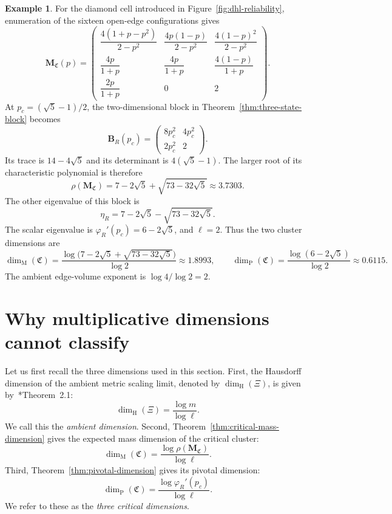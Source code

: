\documentclass[scheme=plain,11pt]{ctexart}
\theoremstyle{definition}
\newtheorem{example}[theorem]{Example}
\theoremstyle{remark}
\newcommand{\dimhaus}{\dim_{\mathrm H}}
\newcommand{\dimmass}{\dim_{\mathrm M}}
\begin{document}
\begin{example}\label{ex:dhl-response}\label{ex:dhl-dimensions}
For the diamond cell introduced in Figure~\ref{fig:dhl-reliability}, enumeration of the sixteen open-edge configurations gives
\[
\mathbf M_{\mathfrak C}(p)=
\begin{pmatrix}
\dfrac{4(1+p-p^2)}{2-p^2}&\dfrac{4p(1-p)}{2-p^2}&\dfrac{4(1-p)^2}{2-p^2}\\[2ex]
\dfrac{4p}{1+p}&\dfrac{4p}{1+p}&\dfrac{4(1-p)}{1+p}\\[2ex]
\dfrac{2p}{1+p}&0&2
\end{pmatrix}.
\]
At $p_c=(\sqrt5-1)/2$, the two-dimensional block in Theorem~\ref{thm:three-state-block} becomes
\[
\mathbf B_R(p_c)=
\begin{pmatrix}
8p_c^2&4p_c^2\\
2p_c^2&2
\end{pmatrix}.
\]
Its trace is $14-4\sqrt5$ and its determinant is $4(\sqrt5-1)$.
The larger root of its characteristic polynomial is therefore
\[
\rho(\mathbf M_{\mathfrak C})=7-2\sqrt5+\sqrt{73-32\sqrt5}
\approx3.7303.
\]
The other eigenvalue of this block is
\[
 \eta_R=7-2\sqrt5-\sqrt{73-32\sqrt5}.
\]
The scalar eigenvalue is $\varphi_R'(p_c)=6-2\sqrt5$, and $\ell=2$.
Thus the two cluster dimensions are
\[
 \dimmass(\mathfrak C)
 =\frac{\log\bigl(7-2\sqrt5+\sqrt{73-32\sqrt5}\bigr)}{\log2}
 \approx1.8993,\qquad
 \dim_{\mathrm P}(\mathfrak C)
 =\frac{\log(6-2\sqrt5)}{\log2}\approx0.6115.
\]
The ambient edge-volume exponent is $\log4/\log2=2$.
\end{example}





\section{Why multiplicative dimensions cannot classify}\label{sec:universality}\label{sec:converse-rigidity}\label{sec:three-dimensions}



Let us first recall the three dimensions used in this section.
First, the Hausdorff dimension of the ambient metric scaling limit, denoted by $\dimhaus(\Xi)$, is given by~\cite{neroli2024fractal}*{Theorem~2.1}:
\[
 \dimhaus(\Xi)=\frac{\log m}{\log\ell}.
\]
We call this the \emph{ambient dimension}.
Second, Theorem~\ref{thm:critical-mass-dimension} gives the expected mass dimension of the critical cluster:
\[
 \dimmass(\mathfrak C)=\frac{\log\rho(\mathbf M_{\mathfrak C})}{\log\ell}.
\]
Third, Theorem~\ref{thm:pivotal-dimension} gives its pivotal dimension:
\[
 \dim_{\mathrm P}(\mathfrak C)=\frac{\log\varphi_R'(p_c)}{\log\ell}.
\]
We refer to these as the \emph{three critical dimensions}.
\end{document}
